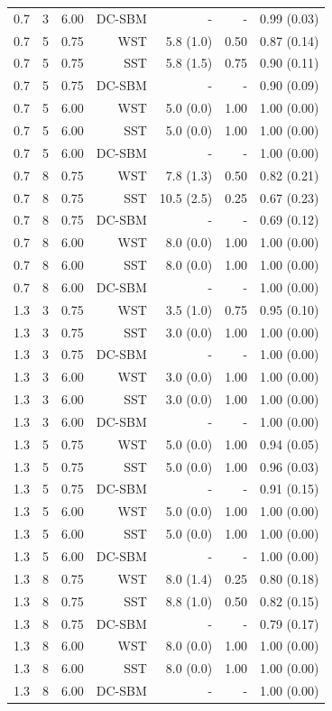\begin{table}[!h]
\begin{tabular}[t]{rrrrrrr}
0.7 & 3 & 6.00 & DC-SBM & - & - & 0.99 (0.03)\\
0.7 & 5 & 0.75 & WST & 5.8 (1.0) & 0.50 & 0.87 (0.14)\\
0.7 & 5 & 0.75 & SST & 5.8 (1.5) & 0.75 & 0.90 (0.11)\\
0.7 & 5 & 0.75 & DC-SBM & - & - & 0.90 (0.09)\\
0.7 & 5 & 6.00 & WST & 5.0 (0.0) & 1.00 & 1.00 (0.00)\\
0.7 & 5 & 6.00 & SST & 5.0 (0.0) & 1.00 & 1.00 (0.00)\\
0.7 & 5 & 6.00 & DC-SBM & - & - & 1.00 (0.00)\\
0.7 & 8 & 0.75 & WST & 7.8 (1.3) & 0.50 & 0.82 (0.21)\\
0.7 & 8 & 0.75 & SST & 10.5 (2.5) & 0.25 & 0.67 (0.23)\\
0.7 & 8 & 0.75 & DC-SBM & - & - & 0.69 (0.12)\\
0.7 & 8 & 6.00 & WST & 8.0 (0.0) & 1.00 & 1.00 (0.00)\\
0.7 & 8 & 6.00 & SST & 8.0 (0.0) & 1.00 & 1.00 (0.00)\\
0.7 & 8 & 6.00 & DC-SBM & - & - & 1.00 (0.00)\\
1.3 & 3 & 0.75 & WST & 3.5 (1.0) & 0.75 & 0.95 (0.10)\\
1.3 & 3 & 0.75 & SST & 3.0 (0.0) & 1.00 & 1.00 (0.00)\\
1.3 & 3 & 0.75 & DC-SBM & - & - & 1.00 (0.00)\\
1.3 & 3 & 6.00 & WST & 3.0 (0.0) & 1.00 & 1.00 (0.00)\\
1.3 & 3 & 6.00 & SST & 3.0 (0.0) & 1.00 & 1.00 (0.00)\\
1.3 & 3 & 6.00 & DC-SBM & - & - & 1.00 (0.00)\\
1.3 & 5 & 0.75 & WST & 5.0 (0.0) & 1.00 & 0.94 (0.05)\\
1.3 & 5 & 0.75 & SST & 5.0 (0.0) & 1.00 & 0.96 (0.03)\\
1.3 & 5 & 0.75 & DC-SBM & - & - & 0.91 (0.15)\\
1.3 & 5 & 6.00 & WST & 5.0 (0.0) & 1.00 & 1.00 (0.00)\\
1.3 & 5 & 6.00 & SST & 5.0 (0.0) & 1.00 & 1.00 (0.00)\\
1.3 & 5 & 6.00 & DC-SBM & - & - & 1.00 (0.00)\\
1.3 & 8 & 0.75 & WST & 8.0 (1.4) & 0.25 & 0.80 (0.18)\\
1.3 & 8 & 0.75 & SST & 8.8 (1.0) & 0.50 & 0.82 (0.15)\\
1.3 & 8 & 0.75 & DC-SBM & - & - & 0.79 (0.17)\\
1.3 & 8 & 6.00 & WST & 8.0 (0.0) & 1.00 & 1.00 (0.00)\\
1.3 & 8 & 6.00 & SST & 8.0 (0.0) & 1.00 & 1.00 (0.00)\\
1.3 & 8 & 6.00 & DC-SBM & - & - & 1.00 (0.00)\\
\bottomrule
\end{tabular}
\end{table}

